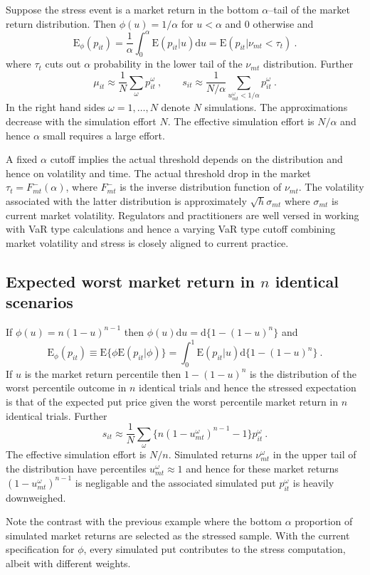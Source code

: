 \documentclass[authoryear]{elsarticle}
\newcommand{\E}{\mathrm{E}}
\renewcommand{\o}{\omega}
\newcommand{\Es}{\E_\phi}
\newcommand{\de}{\mathrm{d}}
\newcommand{\cq}{\ , \qquad}
\begin{document}
Suppose the stress event is a market return in the bottom $\alpha$--tail of the  market return distribution.   Then  $\phi(u)=1/\alpha$ for $u< \alpha$ and 0  otherwise and
$$
\Es(p_{it}) = \frac{1}{\alpha}\int_0^\alpha\E(p_{it}|u)\de u = \E(p_{it}|\nu_{mt}<\tau_{t}) \ .
$$
where $\tau_t$ cuts out $\alpha$ probability in the lower tail of the $\nu_{mt}$ distribution.   Further
$$
\mu_{it}\approx \frac{1}{N} \sum_\o p_{it}^\o \cq s_{it}   \approx  \frac{1}{N/\alpha} \sum_{u^\o_{mt}<1/\alpha}  p_{it}^\o\ .
$$
In the right hand sides $\o=1,\ldots,N$ denote $N$ simulations.  The approximations decrease with the simulation effort $N$.   The effective simulation effort is $N/\alpha$ and hence $\alpha$ small requires a  large effort. 

A fixed $\alpha$ cutoff  implies the actual threshold depends on the distribution and hence  on volatility and  time.  The actual threshold drop in the market $\tau_t=F_{mt}^-(\alpha)$, where $F_{mt}^-$ is the inverse distribution function of $\nu_{mt}$.  The volatility associated with the latter distribution is approximately $\sqrt{h}\sigma_{mt}$ where $\sigma_{mt}$ is current market volatility.   Regulators and practitioners  are well versed in working with VaR type calculations and hence a varying VaR type cutoff combining market volatility and stress is closely aligned to current practice. 


\subsection{Expected worst market return in $n$ identical scenarios} 
If $\phi(u)=n(1-u)^{n-1}$ then $\phi(u)\de u = \de\{1-(1-u)^n\}$ and 
$$
\Es(p_{it}) \equiv \E\{\phi\E(p_{it}|\phi)\} = \int_0^1\E(p_{it}|u)\de\{1-(1-u)^n\}\ .
$$
If $u$ is the market return percentile then  $1-(1-u)^n$ is the distribution of the worst percentile outcome in $n$ identical trials and hence the stressed expectation is that of the expected put price given the worst percentile market return in $n$ identical trials.  Further 
$$
s_{it}  \approx  \frac{1}{N} \sum_\o \{ n(1-u^\o_{mt})^{n-1}-1\}p_{it}^\o \ . 
$$
The effective simulation effort is $N/n$.
Simulated returns $\nu^\o_{mt}$ in the upper tail of the distribution  have percentiles $u^\o_{mt}\approx 1$ and hence for these market returns $(1-u^\o_{mt})^{n-1}$ is negligable and the associated simulated put $p_{it}^\omega$ is heavily downweighed.  

Note the contrast with the previous example where the bottom $\alpha$ proportion of simulated market returns are selected as the stressed sample. With the current specification for $\phi$,   every simulated put contributes to the stress computation, albeit with  different weights.
\end{document}
